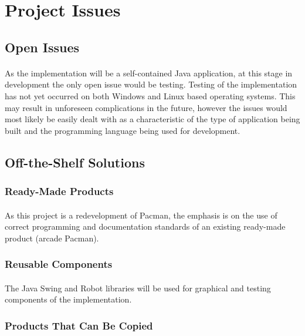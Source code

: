 \documentclass[12pt, titlepage]{article}
\begin{document}
\section{Project Issues}

\subsection{Open Issues}
\paragraph{}
As the implementation will be a self-contained Java application, at this stage in development the only open issue would be testing. Testing of the implementation has not yet occurred on both Windows and Linux based operating systems. 
This may result in unforeseen complications in the future, however the issues would most likely be easily dealt with as a characteristic of the type of application being built and the programming language being used for development.

\subsection{Off-the-Shelf Solutions}

\subsubsection{Ready-Made Products}
\paragraph{}
As this project is a redevelopment of Pacman, the emphasis is on the use of correct programming and documentation standards of an existing ready-made product (arcade Pacman).

\subsubsection{Reusable Components}
\paragraph{}
The Java Swing and Robot libraries will be used for graphical and testing components of the implementation.

\subsubsection{Products That Can Be Copied}
\end{document}
